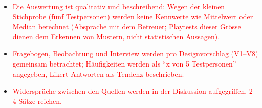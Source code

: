 \documentclass[../Main.tex]{subfiles}
\begin{document}
\begin{itemize}[leftmargin=1.5cm]
    \item \textcolor{red}{Die Auswertung ist qualitativ und beschreibend: Wegen der kleinen Stichprobe (fünf Testpersonen) werden keine Kennwerte wie Mittelwert oder Median berechnet (Absprache mit dem Betreuer; Playtests dieser Grösse dienen dem Erkennen von Mustern, nicht statistischen Aussagen).}
    \item \textcolor{red}{Fragebogen, Beobachtung und Interview werden pro Designvorschlag (V1--V8) gemeinsam betrachtet; Häufigkeiten werden als \enquote{x von 5 Testpersonen} angegeben, Likert-Antworten als Tendenz beschrieben.}
    \item \textcolor{red}{Widersprüche zwischen den Quellen werden in der Diskussion aufgegriffen. 2--4 Sätze reichen.}
\end{itemize}
\end{document}
